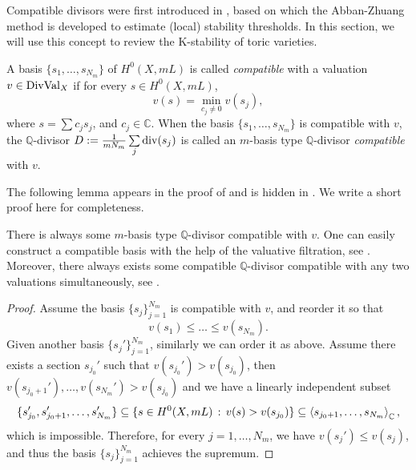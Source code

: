 
Compatible divisors were first introduced in \cite[Definition 2.7]{AZ_Kstab_fano_flag}, based on which the Abban-Zhuang method is developed to estimate (local) stability thresholds. In this section, we will use this concept to review the K-stability of toric varieties.

\begin{definition}
	A basis $\{s_1, \dots, s_{N_m}\}$ of $H^0(X, m L)$ is called \emph{compatible} with a valuation $v \in \mathrm{DivVal}_X$ if for every $s \in H^0(X, m L)$,
	\begin{equation*}
		v(s) = \min_{c_j \neq 0} v(s_j),
	\end{equation*}
	where $s = \sum c_j s_j$, and $c_j \in \mathbb{C}$.
	When the basis $\{s_1, \dots, s_{N_m}\}$ is compatible with $v$, the $\mathbb{Q}$-divisor $D := {1 \over m N_m} \sum_j \div(s_j)$ is called an $m$-basis type $\mathbb{Q}$-divisor \emph{compatible} with $v$.
\end{definition}

The following lemma appears in the proof of \cite[Proposition 3.1]{AZ_Kstab_fano_flag} and is hidden in \cite[\S2.6 and Lemma 3.5]{BJ_thre_val_kst}. We write a short proof here for completeness.
\begin{remark*}
	There is always some $m$-basis type $\mathbb{Q}$-divisor compatible with $v$. One can easily construct a compatible basis with the help of the valuative filtration, see \cite[\S3.1]{BJ_thre_val_kst}. Moreover, there always exists some compatible $\mathbb{Q}$-divisor compatible with any two valuations simultaneously, see \cite[Lemma 3.1]{AZ_Kstab_fano_flag}.
\end{remark*}
\begin{proof}
	Assume the basis $\{s_j\}_{j = 1}^{N_m}$ is compatible with $v$, and reorder it so that
	\begin{equation*}
		v(s_1) \leq \dots \leq v(s_{N_m}).
	\end{equation*}
	Given another basis $\{s_j'\}_{j = 1}^{N_m}$, similarly we can order it as above. Assume there exists a section $s_{j_0}'$ such that $v(s_{j_0}') > v(s_{j_0})$, then $v(s_{j_0 + 1}'), \dots, v(s_{N_m}') > v(s_{j_0})$ and we have a linearly independent subset
	\begin{equation*}
		\{s_{j_0}', s_{j_0 + 1}', \dots, s_{N_m}'\} \subseteq \{s \in H^0(X, m L) \,:\, v(s) > v(s_{j_0})\} \subseteq \left\langle s_{j_0 + 1}, \dots, s_{N_m}\right\rangle_\mathbb{C},
	\end{equation*}
	which is impossible. Therefore, for every $j = 1, \dots, N_m$, we have $v(s_j') \leq v(s_j)$, and thus the basis $\{s_j\}_{j = 1}^{N_m}$ achieves the supremum.
\end{proof}


